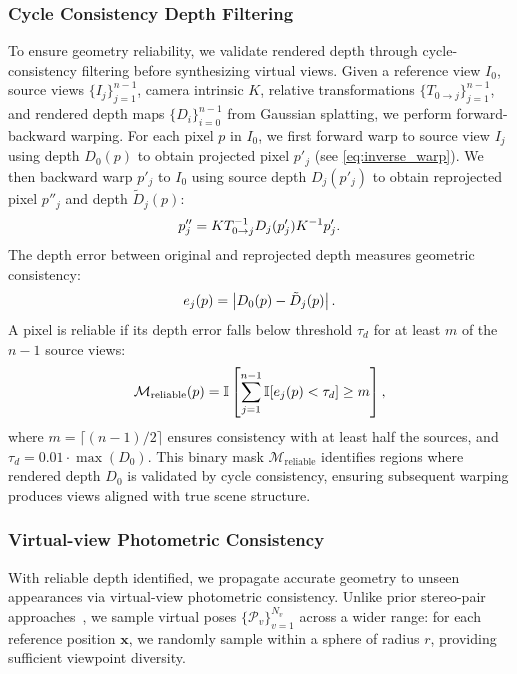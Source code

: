 \subsubsection{Cycle Consistency Depth Filtering}
\label{sec:depth_filter}
To ensure geometry reliability, we validate rendered depth through cycle-consistency filtering before synthesizing virtual views.
Given a reference view $I_{\text{0}}$, source views $\{I_j\}_{j=1}^{n-1}$, camera 
intrinsic $K$, relative transformations $\{T_{0 \rightarrow j} \}_{j=1}^{n-1}$, and rendered depth 
maps $\{D_i\}_{i=0}^{n-1}$ from Gaussian splatting, we perform forward-backward 
warping.
For each pixel $p$ in $I_{\text{0}}$, we first forward warp to source 
view $I_j$ using depth $D_0(p)$ to obtain projected pixel $p'_{j}$ (see \cref{eq:inverse_warp}). 
We then backward warp $p'_{j}$ to $I_{\text{0}}$ using source depth $D_j(p'_{j})$ 
to obtain reprojected pixel $p''_{j}$ and depth $\tilde{D}_j(p)$:
\begin{equation}
  \vspace{-0.2cm}
\label{eq:inverse_warp_back}
p''_j = KT^{-1}_{0 \rightarrow j}D_j(p'_{j})K^{-1}p'_{j}.
\end{equation}
The depth error between original and reprojected depth measures geometric consistency:
\begin{equation}
\label{eq:depth_error}
\vspace{-0.2cm}
e_j(p) = \left| D_{\text{0}}(p) - \tilde{D}_j(p) \right|.
\end{equation}
A pixel is reliable if its depth error falls below threshold $\tau_d$ for at 
least $m$ of the $n-1$ source views:
\begin{equation}
  \vspace{-0.2cm}
\label{eq:depth_mask}
\mathcal{M}_{\text{reliable}}(p) = \mathbb{I}\left[ \sum_{j=1}^{n-1} \mathbb{I}[e_j(p) < \tau_d] \geq m \right],
\end{equation}
where $m = \lceil (n-1)/2 \rceil$ ensures consistency with at least half the 
sources, and $\tau_d = 0.01 \cdot \max(D_{\text{0}})$. This binary mask 
$\mathcal{M}_{\text{reliable}}$ identifies regions where rendered depth $D_0$ is 
validated by cycle consistency, ensuring subsequent warping produces views 
aligned with true scene structure.


\subsubsection{Virtual-view Photometric Consistency}
\label{sec:reliable_synthesis}
With reliable depth identified, we propagate accurate geometry to unseen appearances via virtual-view photometric consistency. 
Unlike prior stereo-pair approaches~\cite{han2024binocular}, we sample virtual poses $\{\mathcal{P}_v\}_{v=1}^{N_v}$ across a wider range: for each reference position $\mathbf{x}$, we randomly sample within a sphere of radius $r$, providing sufficient viewpoint diversity.


